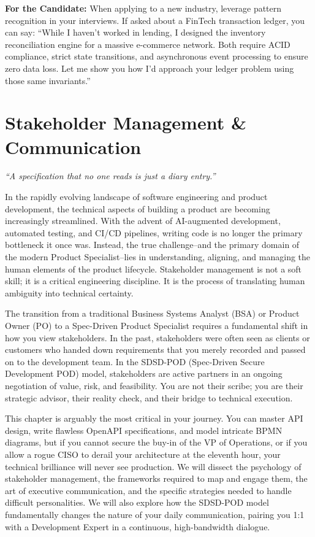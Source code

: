 \documentclass[
  11pt,
  openany,
  oneside]{book}
\renewenvironment{quote}{\begin{customquote}}{\end{customquote}}
\begin{document}
\begin{quote}
\textbf{For the Candidate:} When applying to a new industry, leverage
pattern recognition in your interviews. If asked about a FinTech
transaction ledger, you can say: ``While I haven't worked in lending, I
designed the inventory reconciliation engine for a massive e-commerce
network. Both require ACID compliance, strict state transitions, and
asynchronous event processing to ensure zero data loss. Let me show you
how I'd approach your ledger problem using those same invariants.''
\end{quote}

\chapter{Stakeholder Management \&
Communication}\label{stakeholder-management-communication}

\begin{quote}
\emph{``A specification that no one reads is just a diary entry.''}
\end{quote}

In the rapidly evolving landscape of software engineering and product
development, the technical aspects of building a product are becoming
increasingly streamlined. With the advent of AI-augmented development,
automated testing, and CI/CD pipelines, writing code is no longer the
primary bottleneck it once was. Instead, the true challenge--and the
primary domain of the modern Product Specialist--lies in understanding,
aligning, and managing the human elements of the product lifecycle.
Stakeholder management is not a soft skill; it is a critical engineering
discipline. It is the process of translating human ambiguity into
technical certainty.

The transition from a traditional Business Systems Analyst (BSA) or
Product Owner (PO) to a Spec-Driven Product Specialist requires a
fundamental shift in how you view stakeholders. In the past,
stakeholders were often seen as clients or customers who handed down
requirements that you merely recorded and passed on to the development
team. In the SDSD-POD (Spec-Driven Secure Development POD) model,
stakeholders are active partners in an ongoing negotiation of value,
risk, and feasibility. You are not their scribe; you are their strategic
advisor, their reality check, and their bridge to technical execution.

This chapter is arguably the most critical in your journey. You can
master API design, write flawless OpenAPI specifications, and model
intricate BPMN diagrams, but if you cannot secure the buy-in of the VP
of Operations, or if you allow a rogue CISO to derail your architecture
at the eleventh hour, your technical brilliance will never see
production. We will dissect the psychology of stakeholder management,
the frameworks required to map and engage them, the art of executive
communication, and the specific strategies needed to handle difficult
personalities. We will also explore how the SDSD-POD model fundamentally
changes the nature of your daily communication, pairing you 1:1 with a
Development Expert in a continuous, high-bandwidth dialogue.
\end{document}
